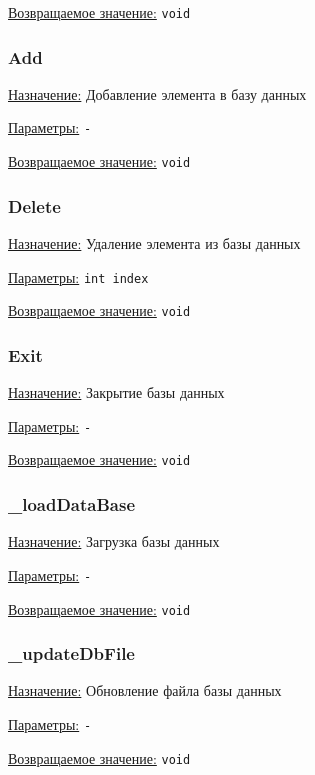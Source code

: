 \underline{Возвращаемое значение:} \verb|void|


\subsubsection{Add}

\underline{Назначение:}
Добавление элемента в базу данных

\underline{Параметры:} \verb|-|

\underline{Возвращаемое значение:} \verb|void|


\subsubsection{Delete}

\underline{Назначение:}
Удаление элемента из базы данных

\underline{Параметры:} \verb|int index|

\underline{Возвращаемое значение:} \verb|void|


\subsubsection{Exit}

\underline{Назначение:}
Закрытие базы данных

\underline{Параметры:} \verb|-|

\underline{Возвращаемое значение:} \verb|void|


\subsubsection{\_loadDataBase}

\underline{Назначение:}
Загрузка базы данных

\underline{Параметры:} \verb|-|

\underline{Возвращаемое значение:} \verb|void|


\subsubsection{\_updateDbFile}

\underline{Назначение:}
Обновление файла базы данных

\underline{Параметры:} \verb|-|

\underline{Возвращаемое значение:} \verb|void|

